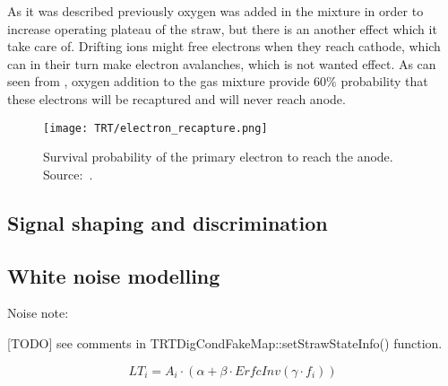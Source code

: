 As it was described previously oxygen was added in the mixture in order to increase operating plateau of the straw, but there is an another effect which it take care of.
Drifting ions might free electrons when they reach cathode, which can in their turn make electron avalanches, which is not wanted effect.
As can seen from , oxygen addition to the gas mixture provide 60$\%$ probability that these electrons will be recaptured 
and will never reach anode. 

\begin{figure}
\centering
\texttt{[image: TRT/electron\_recapture.png]}
\caption{ 
 Survival probability of the primary electron to reach the anode. Source:~\cite{esben_thesis}.
}
\label{fig:electron_recapture}
\end{figure}

\subsection{Signal shaping and discrimination}


\subsection{White noise modelling}

Noise note:~\cite{Kittelmann:987854}


[TODO] see comments in TRTDigCondFakeMap::setStrawStateInfo() function.


\begin{equation}
 LT_i = A_i \cdot (\alpha + \beta \cdot ErfcInv(\gamma \cdot f_i)) %
\end{equation}




